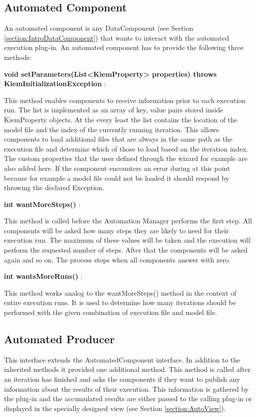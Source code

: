\subsection{Automated Component}
An automated component is any DataComponent (see Section \ref{section:IntroDataComponent}) that wants to interact with
the automated execution plug-in. An automated component has to provide the following three methods:

\begin{description}
 \item \textbf{void setParameters(List<KiemProperty> properties) throws KiemInitializationException} : 

This method enables components to receive information prior to each execution
run. The list is implemented as an array of key, value pairs stored inside
KiemProperty objects.
At the every least the list contains the location of the model file and the
index of the currently running iteration.
This allows components to load additional files that are always in the
same path as the execution file and determine which of those to load
based on the iteration index.
The custom properties that the user defined through the wizard for example are
also added here.
If the component encounters an error during at this point because for example a model file
could not be loaded it should respond by throwing the declared Exception.

 \item \textbf{int wantMoreSteps()} : 

This method is called before the Automation Manager performs the first step.
All components will be asked how many steps they are likely to need for their
execution run. The maximum of these values will be taken and the execution
will perform the requested number of steps. After that the components
will be asked again and so on. The process stops when all components
answer with zero.

 \item \textbf{int wantsMoreRuns()} : 

This method works analog to the wantMoreSteps() method in the context
of entire execution runs. It is used to determine how many iterations
should be performed with the given combination of execution file and model
file.
\end{description}

\subsection{Automated Producer}
This interface extends the AutomatedComponent interface.
In addition to the inherited methods it provided one additional method.
This method is called after an iteration has finished and asks the components
if they want to publish any information about the results of their execution.
This information is gathered by the plug-in and the accumulated results
are either passed to the calling plug-in or displayed in the
specially designed view (see Section \ref{section:AutoView}).



